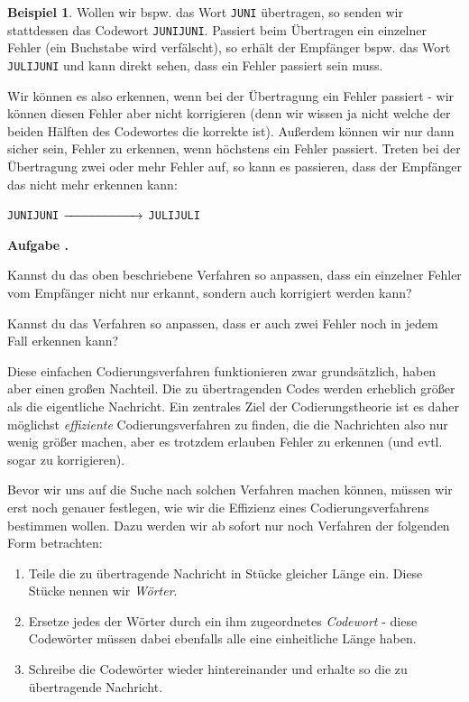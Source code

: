 \documentclass[a4paper,ngerman,12pt]{scrartcl}
\newcommand{\red}[1]{{\color{red}#1}}
\theoremstyle{definition}
\newtheorem{bsp}[defn]{Beispiel}
\theoremstyle{plain}
\theoremstyle{remark}
\newlength{\aufgabenskip}
\newcounter{aufgabennummer}
\newenvironment{aufgabe}[1]{
	\addtocounter{aufgabennummer}{1}
	\textbf{Aufgabe \theaufgabennummer.} \emph{#1} \par
}{\vspace{\aufgabenskip}}
\begin{document}
\begin{bsp}	
	Wollen wir bspw. das Wort \texttt{JUNI} übertragen, so senden wir stattdessen das Codewort \texttt{JUNIJUNI}. Passiert beim Übertragen ein einzelner Fehler (ein Buchstabe wird verfälscht), so erhält der Empfänger bspw. das Wort \texttt{JU\red{L}IJUNI} und kann direkt sehen, dass ein Fehler passiert sein muss.
\end{bsp}

Wir können es also erkennen, wenn bei der Übertragung ein Fehler passiert - wir können diesen Fehler aber nicht korrigieren (denn wir wissen ja nicht welche der beiden Hälften des Codewortes die korrekte ist). Außerdem können wir nur dann sicher sein, Fehler zu erkennen, wenn höchstens ein Fehler passiert. Treten bei der Übertragung zwei oder mehr Fehler auf, so kann es passieren, dass der Empfänger das nicht mehr erkennen kann:
	\begin{center}
		\texttt{JUNIJUNI} $\xrightarrow{\hspace*{2cm}}$ \texttt{JU\red{L}IJU\red{L}I}
	\end{center}

\begin{aufgabe}{}\label{aufgabe:verdreifachungsCodierung}
	Kannst du das oben beschriebene Verfahren so anpassen, dass ein einzelner Fehler vom Empfänger nicht nur erkannt, sondern auch korrigiert werden kann?
	
	Kannst du das Verfahren so anpassen, dass er auch zwei Fehler noch in jedem Fall erkennen kann?
\end{aufgabe}

Diese einfachen Codierungsverfahren funktionieren zwar grundsätzlich, haben aber einen großen Nachteil. Die zu übertragenden Codes werden erheblich größer als die eigentliche Nachricht. Ein zentrales Ziel der Codierungstheorie ist es daher möglichst \emph{effiziente} Codierungsverfahren zu finden, die die Nachrichten also nur wenig größer machen, aber es trotzdem erlauben Fehler zu erkennen (und evtl. sogar zu korrigieren).

Bevor wir uns auf die Suche nach solchen Verfahren machen können, müssen wir erst noch genauer festlegen, wie wir die Effizienz eines Codierungsverfahrens bestimmen wollen. Dazu werden wir ab sofort nur noch Verfahren der folgenden Form betrachten: 
\begin{enumerate}
	\item Teile die zu übertragende Nachricht in Stücke gleicher Länge ein. Diese Stücke nennen wir \emph{Wörter}. 
	\item Ersetze jedes der Wörter durch ein ihm zugeordnetes \emph{Codewort} - diese Codewörter müssen dabei ebenfalls alle eine einheitliche Länge haben.
	\item Schreibe die Codewörter wieder hintereinander und erhalte so die zu übertragende Nachricht.
\end{enumerate}
\end{document}
